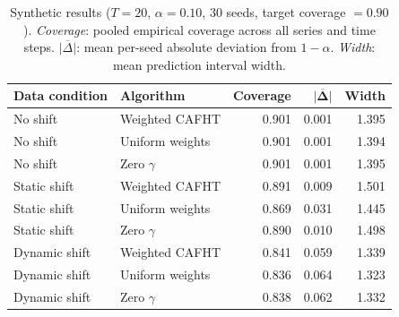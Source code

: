 \begin{table}[ht]
\centering
\small
\setlength{\tabcolsep}{8pt}
\renewcommand{\arraystretch}{1.15}
\caption{%
  Synthetic results ($T=20$, $\alpha=0.10$, 30 seeds, target coverage $= 0.90$).
  \textit{Coverage}: pooled empirical coverage across all series and time steps.
  $\overline{|\Delta|}$: mean per-seed absolute deviation from $1-\alpha$.
  \textit{Width}: mean prediction interval width.
}
\label{tab:synthetic}
\begin{tabular}{@{} llrrr @{}}
\toprule
{\bfseries Data condition} & {\bfseries Algorithm}
  & {\bfseries Coverage} & $\boldsymbol{\overline{|\Delta|}}$ & {\bfseries Width} \\
\midrule
No shift
  & Weighted CAFHT      & 0.901 & 0.001 & 1.395 \\
No shift
  & Uniform weights     & 0.901 & 0.001 & 1.394 \\
No shift
  & Zero $\gamma$       & 0.901 & 0.001 & 1.395 \\
\midrule
Static shift
  & Weighted CAFHT      & 0.891 & 0.009 & 1.501 \\
Static shift
  & Uniform weights     & 0.869 & 0.031 & 1.445 \\
Static shift
  & Zero $\gamma$       & 0.890 & 0.010 & 1.498 \\
\midrule
Dynamic shift
  & Weighted CAFHT      & 0.841 & 0.059 & 1.339 \\
Dynamic shift
  & Uniform weights     & 0.836 & 0.064 & 1.323 \\
Dynamic shift
  & Zero $\gamma$       & 0.838 & 0.062 & 1.332 \\
\bottomrule
\end{tabular}
\end{table}



